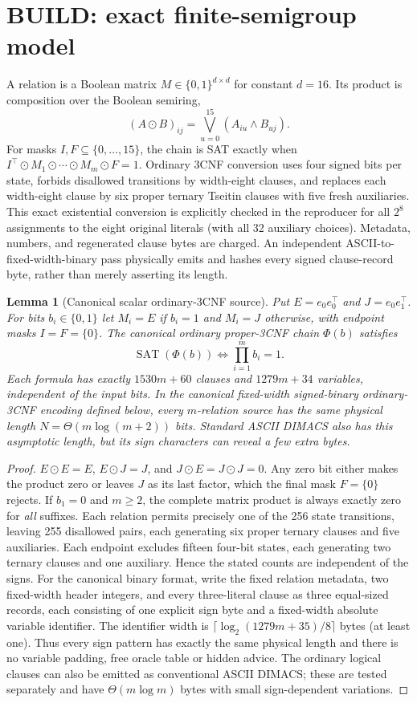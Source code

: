 \documentclass[11pt]{article}
\newtheorem{lemma}[theorem]{Lemma}
\begin{document}
\section{BUILD: exact finite-semigroup model}
A relation is a Boolean matrix $M\in\{0,1\}^{d\times d}$ for constant $d=16$. Its product is composition over the Boolean semiring,
\[
(A\odot B)_{ij}=\bigvee_{u=0}^{15}(A_{iu}\land B_{uj}).
\]
For masks $I,F\subseteq\{0,\ldots,15\}$, the chain is SAT exactly when $I^\top\odot M_1\odot\cdots\odot M_m\odot F=1$. Ordinary 3CNF conversion uses four signed bits per state, forbids disallowed transitions by width-eight clauses, and replaces each width-eight clause by six proper ternary Tseitin clauses with five fresh auxiliaries. This exact existential conversion is explicitly checked in the reproducer for all $2^8$ assignments to the eight original literals (with all 32 auxiliary choices). Metadata, numbers, and regenerated clause bytes are charged. An independent ASCII-to-fixed-width-binary pass physically emits and hashes every signed clause-record byte, rather than merely asserting its length.

\begin{lemma}[Canonical scalar ordinary-3CNF source]\label{lem:scalar}
Put $E=e_0e_0^\top$ and $J=e_0e_1^\top$. For bits $b_i\in\{0,1\}$ let $M_i=E$ if $b_i=1$ and $M_i=J$ otherwise, with endpoint masks $I=F=\{0\}$. The canonical ordinary proper-3CNF chain $\Phi(b)$ satisfies
\[
\operatorname{SAT}(\Phi(b))\iff\prod_{i=1}^m b_i=1.
\]
Each formula has exactly $1530m+60$ clauses and $1279m+34$ variables, independent of the input bits. In the canonical fixed-width signed-binary ordinary-3CNF encoding defined below, every $m$-relation source has the \emph{same physical length} $N=\Theta(m\log(m+2))$ bits. Standard ASCII DIMACS also has this asymptotic length, but its sign characters can reveal a few extra bytes.
\end{lemma}
\begin{proof}
$E\odot E=E$, $E\odot J=J$, and $J\odot E=J\odot J=0$. Any zero bit either makes the product zero or leaves $J$ as its last factor, which the final mask $F=\{0\}$ rejects. If $b_1=0$ and $m\ge2$, the complete matrix product is always exactly zero for \emph{all} suffixes. Each relation permits precisely one of the 256 state transitions, leaving 255 disallowed pairs, each generating six proper ternary clauses and five auxiliaries. Each endpoint excludes fifteen four-bit states, each generating two ternary clauses and one auxiliary. Hence the stated counts are independent of the signs. For the canonical binary format, write the fixed relation metadata, two fixed-width header integers, and every three-literal clause as three equal-sized records, each consisting of one explicit sign byte and a fixed-width absolute variable identifier. The identifier width is $\lceil\log_2(1279m+35)/8\rceil$ bytes (at least one). Thus every sign pattern has exactly the same physical length and there is no variable padding, free oracle table or hidden advice. The ordinary logical clauses can also be emitted as conventional ASCII DIMACS; these are tested separately and have $\Theta(m\log m)$ bytes with small sign-dependent variations.
\end{proof}
\end{document}
